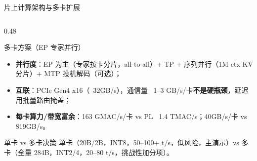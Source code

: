 \documentclass[aspectratio=169]{beamer}
\begin{document}
\begin{frame}{片上计算架构与多卡扩展}
\begin{columns}[T]
\begin{column}{0.48\textwidth}
\begin{block}{多卡方案（EP 专家并行）}
\end{block}
\begin{itemize}\footnotesize
  \item \textbf{并行度}：EP 为主（专家按卡分片，all-to-all）+ TP + 序列并行（1M ctx KV 分片）+ MTP 投机解码（可选）；
  \item \textbf{互联}：PCIe Gen4 x16（~32GB/s），通信量 ~1–3 GB/s/卡\textbf{不是硬瓶颈}，延迟用批量路由掩盖；
  \item \textbf{每卡算力/带宽富余}：163 GMAC/s/卡 vs PL ~1.4 TMAC/s；40GB/s/卡 vs 819GB/s。
\end{itemize}
\begin{block}{单卡 vs 多卡决策}
\footnotesize 单卡（20B/2B，INT8，50–100+ t/s，低风险，主演示）vs 多卡（全量 284B，INT2/4，20–80 t/s，挑战性加分项）。
\end{block}
\end{column}
\end{columns}
\end{frame}
\end{document}
